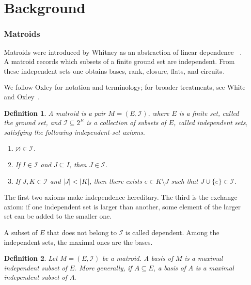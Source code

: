 \documentclass[11pt]{article}
\numberwithin{equation}{section}
\newtheorem{definition}{Definition}[section]
\theoremstyle{remark}
\begin{document}
\part{Background}

\section{Matroids}
\label{sec:matroids}

Matroids were introduced by Whitney as an abstraction of linear dependence
~\cite{Whitney1935}. A matroid records which subsets of a finite ground set
are independent. From these independent sets one obtains bases, rank,
closure, flats, and circuits.

We follow Oxley for notation and terminology; for broader treatments, see
White and Oxley~\cite{White1986,Oxley2011}.

\begin{definition}
\label{def:matroid}
A \emph{matroid} is a pair $M=(E,\mathcal I)$, where $E$ is a finite set, called the \emph{ground set}, and $\mathcal I\subseteq 2^E$ is a collection of subsets of $E$, called \emph{independent sets}, satisfying the following independent-set axioms.
\begin{enumerate}
    \item[(I1)] $\varnothing\in\mathcal I$.
    \item[(I2)] If $I\in\mathcal I$ and $J\subseteq I$, then $J\in\mathcal I$.
    \item[(I3)] If $J,K\in\mathcal I$ and $|J|<|K|$, then there exists $e\in K\setminus J$ such that $J\cup\{e\}\in\mathcal I$.
\end{enumerate}
\end{definition}

The first two axioms make independence hereditary. The third is the exchange
axiom: if one independent set is larger than another, some element of the
larger set can be added to the smaller one.

A subset of $E$ that does not belong to $\mathcal I$ is called dependent. Among the independent sets, the maximal ones are the bases.

\begin{definition}
\label{def:matroid-basis}
Let $M=(E,\mathcal I)$ be a matroid. A \emph{basis} of $M$ is a maximal independent subset of $E$. More generally, if $A\subseteq E$, a basis of $A$ is a maximal independent subset of $A$.
\end{definition}
\end{document}
